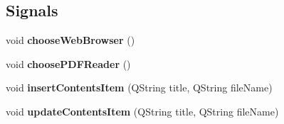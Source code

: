 \subsection*{Signals}
\begin{DoxyCompactItemize}
\item 
\hypertarget{classHelpWindow_a3beac1f8c2cc708e22cbb0b339ff75cd}{
void {\bfseries chooseWebBrowser} ()}
\label{classHelpWindow_a3beac1f8c2cc708e22cbb0b339ff75cd}

\item 
\hypertarget{classHelpWindow_a57e4f85121503dc7ef62ddffe1cee38a}{
void {\bfseries choosePDFReader} ()}
\label{classHelpWindow_a57e4f85121503dc7ef62ddffe1cee38a}

\item 
\hypertarget{classHelpWindow_ac443e5982d6a94e37a833615b29f4e9f}{
void {\bfseries insertContentsItem} (QString title, QString fileName)}
\label{classHelpWindow_ac443e5982d6a94e37a833615b29f4e9f}

\item 
\hypertarget{classHelpWindow_a6b5b5a6bfeae161002273ae54a378cd1}{
void {\bfseries updateContentsItem} (QString title, QString fileName)}
\label{classHelpWindow_a6b5b5a6bfeae161002273ae54a378cd1}

\end{DoxyCompactItemize}
